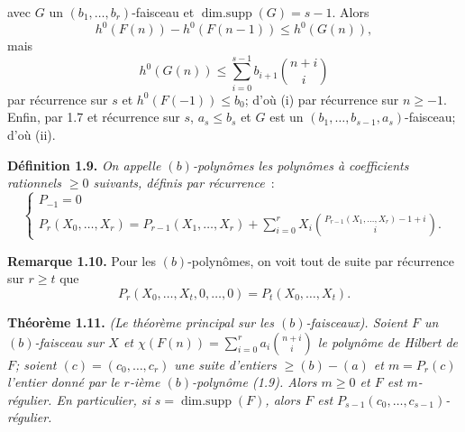 
avec \(G\) un \((b_1,\ldots,b_r)\)-faisceau et \(\operatorname{dim{.}supp}(G)=s-1\). Alors
\[
h^0(F(n))-h^0(F(n-1))\le h^0(G(n)),
\]
mais
\[
h^0(G(n))\le\sum_{i=0}^{s-1}b_{i+1}\binom{n+i}{i}
\]
par récurrence sur \(s\) et \(h^0(F(-1))\le b_0\); d'où (i) par récurrence sur \(n\ge -1\). Enfin, par 1.7 et récurrence sur \(s\), \(a_s\le b_s\) et \(G\) est un \((b_1,\ldots,b_{s-1},a_s)\)-faisceau; d'où (ii).

\textbf{Définition 1.9.} \emph{On appelle \emph{\((b)\)-polynômes} les polynômes à coefficients rationnels \(\ge0\) suivants, définis par récurrence}~:
\[
\begin{cases}
P_{-1}=0\\
P_r(X_0,\ldots,X_r)=P_{r-1}(X_1,\ldots,X_r)
+\displaystyle\sum_{i=0}^{r}X_i
\binom{P_{r-1}(X_1,\ldots,X_r)-1+i}{i}.
\end{cases}
\]

\textbf{Remarque 1.10.} Pour les \((b)\)-polynômes, on voit tout de suite par récurrence sur \(r\ge t\) que
\[
P_r(X_0,\ldots,X_t,0,\ldots,0)=P_t(X_0,\ldots,X_t).
\]

\textbf{Théorème 1.11.} \emph{(Le théorème principal sur les \((b)\)-faisceaux). Soient \(F\) un \((b)\)-faisceau sur \(X\) et \(\chi(F(n))=\sum_{i=0}^{r}a_i\binom{n+i}{i}\) le polynôme de Hilbert de \(F\); soient \((c)=(c_0,\ldots,c_r)\) une suite d'entiers \(\ge (b)-(a)\) et \(m=P_r(c)\) l'entier donné par le \(r\)-ième \((b)\)-polynôme (1.9). Alors \(m\ge0\) et \(F\) est \(m\)-régulier. En particulier, si \(s=\operatorname{dim{.}supp}(F)\), alors \(F\) est \(P_{s-1}(c_0,\ldots,c_{s-1})\)-régulier.}

